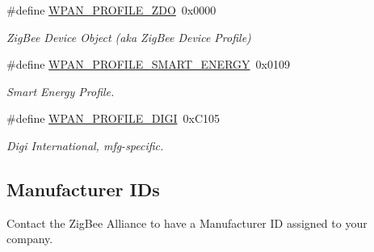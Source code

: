 \begin{DoxyCompactItemize}
\item 
\hypertarget{group__wpan__aps_gabdbce33bdd976b65877a241842b73a20}{\#define \hyperlink{group__wpan__aps_gabdbce33bdd976b65877a241842b73a20}{W\-P\-A\-N\-\_\-\-P\-R\-O\-F\-I\-L\-E\-\_\-\-Z\-D\-O}~0x0000}\label{group__wpan__aps_gabdbce33bdd976b65877a241842b73a20}

\begin{DoxyCompactList}\small\item\em Zig\-Bee Device Object (aka Zig\-Bee Device Profile) \end{DoxyCompactList}\item 
\hypertarget{group__wpan__aps_ga7cc56763cce2df7785d8d5e75f9e1a40}{\#define \hyperlink{group__wpan__aps_ga7cc56763cce2df7785d8d5e75f9e1a40}{W\-P\-A\-N\-\_\-\-P\-R\-O\-F\-I\-L\-E\-\_\-\-S\-M\-A\-R\-T\-\_\-\-E\-N\-E\-R\-G\-Y}~0x0109}\label{group__wpan__aps_ga7cc56763cce2df7785d8d5e75f9e1a40}

\begin{DoxyCompactList}\small\item\em Smart Energy Profile. \end{DoxyCompactList}\item 
\hypertarget{group__wpan__aps_gaa90d7d1301c7de503f39113eb83e93e5}{\#define \hyperlink{group__wpan__aps_gaa90d7d1301c7de503f39113eb83e93e5}{W\-P\-A\-N\-\_\-\-P\-R\-O\-F\-I\-L\-E\-\_\-\-D\-I\-G\-I}~0x\-C105}\label{group__wpan__aps_gaa90d7d1301c7de503f39113eb83e93e5}

\begin{DoxyCompactList}\small\item\em Digi International, mfg-\/specific. \end{DoxyCompactList}\end{DoxyCompactItemize}
\subsection*{Manufacturer I\-Ds}
\label{_amgrp81f39d32ef7ae17245197138275a83b5}%
Contact the Zig\-Bee Alliance to have a Manufacturer I\-D assigned to your company.


